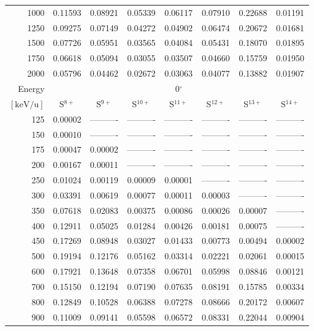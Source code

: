 \begin{table}[ht]
\begin{tabular}{r|c|c|c|c|c|c|c}
     1000 & 0.11593 & 0.08921 & 0.05339 & 0.06117 & 0.07910 & 0.22688 & 0.01191 \\
     1250 & 0.09275 & 0.07149 & 0.04272 & 0.04902 & 0.06474 & 0.20672 & 0.01681 \\
     1500 & 0.07726 & 0.05951 & 0.03565 & 0.04084 & 0.05431 & 0.18070 & 0.01895 \\
     1750 & 0.06618 & 0.05094 & 0.03055 & 0.03507 & 0.04660 & 0.15759 & 0.01950 \\
     2000 & 0.05796 & 0.04462 & 0.02672 & 0.03063 & 0.04077 & 0.13882 & 0.01907 \\ \cline{1-8}
    Energy & \multicolumn{7}{c}{0$^\circ$} \\ \cline{2-8}
    $\mathrm{[keV/u]}$ & S$^{8+}$ & S$^{9+}$ & S$^{10+}$ & S$^{11+}$ & S$^{12+}$ & S$^{13+}$ & S$^{14+}$ \\ \cline{1-8}
      125 & 0.00002 & ---------- & ---------- & ---------- & ---------- & ---------- & ---------- \\
      150 & 0.00010 & ---------- & ---------- & ---------- & ---------- & ---------- & ---------- \\
      175 & 0.00047 & 0.00002 & ---------- & ---------- & ---------- & ---------- & ---------- \\
      200 & 0.00167 & 0.00011 & ---------- & ---------- & ---------- & ---------- & ---------- \\
      250 & 0.01024 & 0.00119 & 0.00009 & 0.00001 & ---------- & ---------- & ---------- \\
      300 & 0.03391 & 0.00619 & 0.00077 & 0.00011 & 0.00003 & ---------- & ---------- \\
      350 & 0.07618 & 0.02083 & 0.00375 & 0.00086 & 0.00026 & 0.00007 & ---------- \\
      400 & 0.12911 & 0.05025 & 0.01284 & 0.00426 & 0.00181 & 0.00075 & ---------- \\
      450 & 0.17269 & 0.08948 & 0.03027 & 0.01433 & 0.00773 & 0.00494 & 0.00002 \\
      500 & 0.19194 & 0.12176 & 0.05162 & 0.03314 & 0.02221 & 0.02061 & 0.00015 \\
      600 & 0.17921 & 0.13648 & 0.07358 & 0.06701 & 0.05998 & 0.08846 & 0.00121 \\
      700 & 0.15150 & 0.12194 & 0.07190 & 0.07635 & 0.08191 & 0.15785 & 0.00334 \\
      800 & 0.12849 & 0.10528 & 0.06388 & 0.07278 & 0.08666 & 0.20172 & 0.00607 \\
      900 & 0.11009 & 0.09141 & 0.05598 & 0.06572 & 0.08331 & 0.22044 & 0.00904 \\

\end{tabular}
\end{table}
